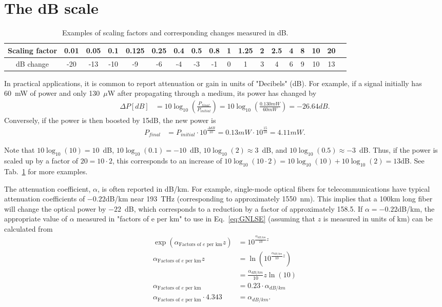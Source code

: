 \section{The dB scale}
\begin{table}[]
    \centering
    \begin{tabular}{ c|c|c|c|c|c|c|c|c|c|c|c|c|c|c|c|c|c }
\label{tab:dB}
 Scaling factor &0.01&0.05 & 0.1 &0.125 &0.25&0.4 &0.5 & 0.8&1&1.25 &2 &2.5 &4 &8 &10 &20 & \\  \hline
 dB change & -20 &-13 &-10 & -9&  -6&-4& -3&-1&0&1 &3 &4 &6 &9 & 10&13 
\end{tabular}
    \caption{Examples of scaling factors and corresponding changes measured in dB.}
    \label{tab:dB}
\end{table}
In practical applications, it is common to report attenuation or gain in units of "Decibels" (dB). For example, if a signal initially has 60~mW of power and only 130~$\mu$W after propagating through a medium, its power has changed by
\begin{align}
    \Delta P [dB] &= 10 \log_{10}\left(\frac{P_{final}}{P_{initial}} \right)= 10 \log_{10}\left(\frac{0.130 mW}{60 mW} \right) = -26.64 dB.
\end{align}
Conversely, if the power is then boosted by 15dB, the new power is
\begin{align}
\label{eq:boost}
    P_{final}&=P_{initial}\cdot10^{\frac{\Delta dB}{10}}=0.13mW\cdot10^{\frac{15}{10}} = 4.11 mW.
\end{align}


Note that $10\log_{10}(10)=10$~dB, $10\log_{10}(0.1)=-10$~dB, $10\log_{10}(2)\approx3$~dB, and $10\log_{10}(0.5)\approx-3$~dB. Thus, if the power is scaled up by a factor of $20=10\cdot 2$, this corresponds to an increase of $10\log_{10}(10\cdot 2) = 10\log_{10}(10)+10\log_{10}(2) = 13$dB. See Tab.~\ref{tab:dB} for more examples. 

The attenuation coefficient, $\alpha$, is often reported in dB/km. For example, single-mode optical fibers for telecommunications  have typical attenuation coefficients of $-0.22$dB/km near 193~THz (corresponding to approximately 1550~nm). This implies that a 100km long fiber will change the optical power by $-22$~dB, which corresponds to a reduction by a factor of approximately 158.5. If $\alpha=-0.22$dB/km, the appropriate value of $\alpha$ measured in "factors of e per km" to use in Eq.~\ref{eq:GNLSE} (assuming that $z$ is measured in units of km) can be calculated from
\begin{align}
    \exp\left(\alpha_{\text{Factors of $e$ per km}}z\right) &= 10^{ \frac{\alpha_{dB/km}}{10}z} \\ \nonumber
    \alpha_{\text{Factors of $e$ per km}}z &= \ln\left(10^{ \frac{\alpha_{dB/km}}{10}z} \right)\\ \nonumber
    &= \frac{\alpha_{dB/km}}{10}z \ln(10)\\ \nonumber
    \alpha_{\text{Factors of $e$ per km}} &= 0.23\cdot \alpha_{dB/km}\\ \nonumber
    \alpha_{\text{Factors of $e$ per km}}\cdot4.343&=\alpha_{dB/km}.
\end{align}



